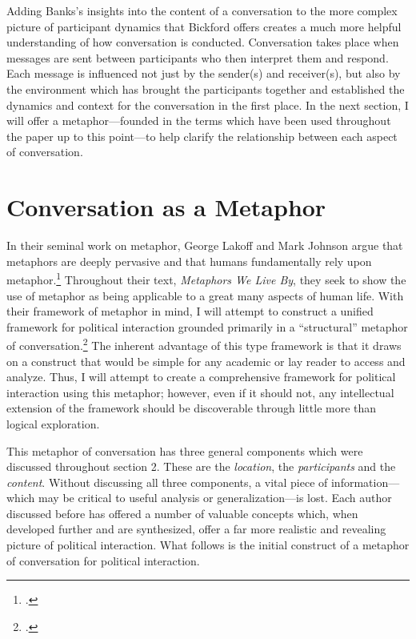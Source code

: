 \documentclass{article}
\begin{document}
Adding Banks's insights into the content of a conversation to the more complex picture of participant dynamics that Bickford offers creates a much more helpful understanding of how conversation is conducted.
Conversation takes place when messages are sent between participants who then interpret them and respond.
Each message is influenced not just by the sender(s) and receiver(s), but also by the environment which has brought the participants together and established the dynamics and context for the conversation in the first place.
In the next section, I will offer a metaphor---founded in the terms which have been used throughout the paper up to this point---to help clarify the relationship between each aspect of conversation.

\section{Conversation as a Metaphor}
In their seminal work on metaphor, George Lakoff and Mark Johnson argue that metaphors are deeply pervasive and that humans fundamentally rely upon metaphor.\footcite[3--6]{lakoffjohnson80}
Throughout their text, \emph{Metaphors We Live By}, they seek to show the use of metaphor as being applicable to a great many aspects of human life.
With their framework of metaphor in mind, I will attempt to construct a unified framework for political interaction grounded primarily in a ``structural'' metaphor of conversation.\footcite[14]{lakoffjohnson80} 
The inherent advantage of this type framework is that it draws on a construct that would be simple for any academic or lay reader to access and analyze.
Thus, I will attempt to create a comprehensive framework for political interaction using this metaphor; however, even if it should not, any intellectual extension of the framework should be discoverable through little more than logical exploration.

This metaphor of conversation has three general components which were discussed throughout section 2.
These are the \emph{location}, the \emph{participants} and the \emph{content}.
Without discussing all three components, a vital piece of information---which may be critical to useful analysis or generalization---is lost.
Each author discussed before has offered a number of valuable concepts which, when developed further and are synthesized, offer a far more realistic and revealing picture of political interaction.
What follows is the initial construct of a metaphor of conversation for political interaction.
\end{document}
